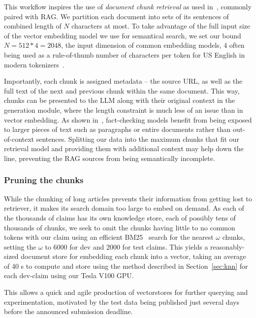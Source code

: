 This workflow inspires the use of \textit{document chunk retrieval} as used in~\cite{rag}, commonly paired with RAG.
We partition each document into sets of its sentences of combined length of $N$ characters at most.
To take advantage of the full input size of the vector embedding model we use for semantical search, we set our bound $N=512*4=2048$,  the input dimension of common embedding models, 4 often being used as a rule-of-thumb number of characters per token for US English in modern tokenizers~\cite{tokens}.

Importantly, each chunk is  assigned metadata -- the source URL, as well as the full text of the next and previous chunk within the same document.
This way, chunks can be presented to the LLM along with their original context in the generation module, where the length constraint is much less of an issue than in vector embedding.
As shown in~\cite{drchal2023pipelinedatasetgenerationautomated}, fact-checking models benefit from being exposed to larger pieces of text such as paragraphs or entire documents rather than out-of-context sentences.
Splitting our data into the maximum chunks that fit our retrieval model and providing them with additional context may help down the line, preventing the RAG sources from being semantically incomplete.

\subsubsection{Pruning the chunks}
While the chunking of long articles prevents their information from getting lost to retriever, it makes its search domain too large to embed on demand.
As each of the thousands of claims has its own knowledge store, each of possibly tens of thousands of chunks, we seek to omit the chunks having little to no common tokens with our claim using an efficient BM25~\cite{bm25} search for the nearest $\omega$ chunks, setting the $\omega$ to 6000 for dev and 2000 for test claims. 
This yields a reasonably-sized document store for embedding each chunk into a vector, taking an average of 40 s to compute and store using the method described in Section~\ref{sec:knn} for each dev-claim using our Tesla V100 GPU.

This allows a quick and agile production of vectorstores for further querying and experimentation, motivated by the \averitec{}  test data being published just several days before the announced submission deadline.

